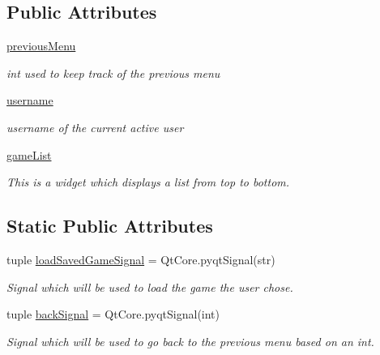 \subsection*{Public Attributes}
\begin{DoxyCompactItemize}
\item 
\hypertarget{classsrc_1_1load__menu_1_1_load_menu_a266279b7ed3e68889b07c1785251c806}{}\hyperlink{classsrc_1_1load__menu_1_1_load_menu_a266279b7ed3e68889b07c1785251c806}{previous\+Menu}\label{classsrc_1_1load__menu_1_1_load_menu_a266279b7ed3e68889b07c1785251c806}

\begin{DoxyCompactList}\small\item\em int used to keep track of the previous menu \end{DoxyCompactList}\item 
\hypertarget{classsrc_1_1load__menu_1_1_load_menu_ab1c940f6352015a62d85b668bc6ebb01}{}\hyperlink{classsrc_1_1load__menu_1_1_load_menu_ab1c940f6352015a62d85b668bc6ebb01}{username}\label{classsrc_1_1load__menu_1_1_load_menu_ab1c940f6352015a62d85b668bc6ebb01}

\begin{DoxyCompactList}\small\item\em username of the current active user \end{DoxyCompactList}\item 
\hyperlink{classsrc_1_1load__menu_1_1_load_menu_af17d0436c9ca2ece0594fbcfd6380162}{game\+List}
\begin{DoxyCompactList}\small\item\em This is a widget which displays a list from top to bottom. \end{DoxyCompactList}\end{DoxyCompactItemize}
\subsection*{Static Public Attributes}
\begin{DoxyCompactItemize}
\item 
tuple \hyperlink{classsrc_1_1load__menu_1_1_load_menu_a9f994468ddeb9d648ce5a68c001fbb36}{load\+Saved\+Game\+Signal} = Qt\+Core.\+pyqt\+Signal(str)
\begin{DoxyCompactList}\small\item\em Signal which will be used to load the game the user chose. \end{DoxyCompactList}\item 
tuple \hyperlink{classsrc_1_1load__menu_1_1_load_menu_a213d15dc1a4c3b77947ea334896268c5}{back\+Signal} = Qt\+Core.\+pyqt\+Signal(int)
\begin{DoxyCompactList}\small\item\em Signal which will be used to go back to the previous menu based on an int. \end{DoxyCompactList}\end{DoxyCompactItemize}


